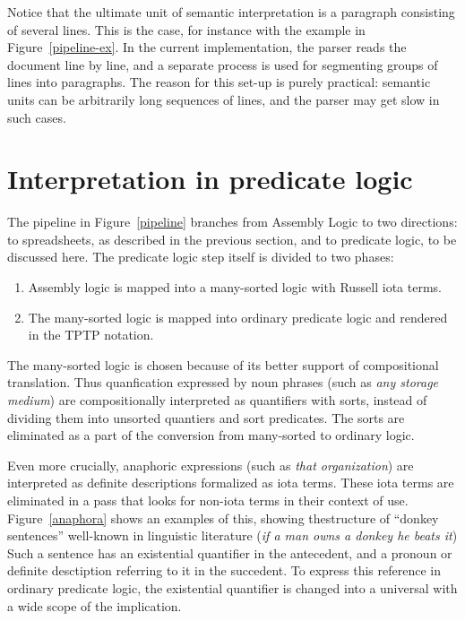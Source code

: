 \documentclass{IOS-Book-Article}
\begin{document}
Notice that the ultimate unit of semantic interpretation is a paragraph consisting of several lines.
This is the case, for instance with the example in Figure~\ref{pipeline-ex}.
In the current implementation, the parser reads the document line by line, and a separate process is used for segmenting groups of lines into paragraphs.
The reason for this set-up is purely practical: semantic units can be arbitrarily long sequences of lines, and the parser may get slow in such cases.




\section{Interpretation in predicate logic}

The pipeline in Figure~\ref{pipeline} branches from Assembly Logic to two directions: to spreadsheets, as described in the previous section, and to predicate logic, to be discussed here.
The predicate logic step itself is divided to two phases:
\begin{enumerate}
\item Assembly logic is mapped into a many-sorted logic with Russell iota terms.
\item The many-sorted logic is mapped into ordinary predicate logic and rendered in the TPTP notation.
\end{enumerate}
The many-sorted logic is chosen because of its better support of compositional translation.
Thus quanfication expressed by noun phrases (such as \textit{any storage medium}) are compositionally interpreted as quantifiers with sorts, instead of dividing them into unsorted quantiers and sort predicates.
The sorts are eliminated as a part of the conversion from many-sorted to ordinary logic.

Even more crucially, anaphoric expressions (such as \textit{that organization}) are interpreted as definite descriptions formalized as iota terms.
These iota terms are eliminated in a pass that looks for non-iota terms in their context of use.
Figure~\ref{anaphora} shows an examples of this, showing thestructure of ``donkey sentences'' well-known in linguistic literature (\textit{if a man owns a donkey he beats it}) \cite{geach-1962,kamp-1981}
Such a sentence has an existential quantifier in the antecedent, and a pronoun or definite desctiption referring to it in the succedent.
To express this reference in ordinary predicate logic, the existential quantifier is changed into a universal with a wide scope of the implication.
\end{document}
